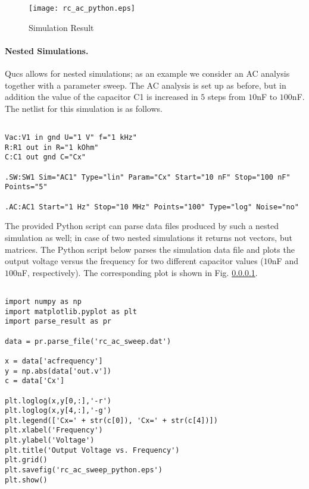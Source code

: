 \begin{figure}[h]
\begin{center}
  \texttt{[image: rc\_ac\_python.eps]}
  \caption{Simulation Result}
  \label{plot:rc_ac_python}
\end{center}
\end{figure}


\pagebreak

\paragraph{Nested Simulations.}Qucs allows for nested simulations; as an example we consider an AC analysis together with a parameter sweep. The AC analysis is set up as before, but in addition the value of the capacitor C1 is increased in $5$ steps from $10$nF to $100$nF. The netlist for this simulation is as follows.


\begin{verbatim}

Vac:V1 in gnd U="1 V" f="1 kHz"
R:R1 out in R="1 kOhm"
C:C1 out gnd C="Cx"

.SW:SW1 Sim="AC1" Type="lin" Param="Cx" Start="10 nF" Stop="100 nF" Points="5"

.AC:AC1 Start="1 Hz" Stop="10 MHz" Points="100" Type="log" Noise="no"

\end{verbatim}


The provided Python script can parse data files produced by such a nested simulation as well; in case of two nested simulations it returns not vectors, but matrices. The Python script below parses the simulation data file and plots the output voltage versus the frequency for two different capacitor values ($10$nF and $100$nF, respectively). The corresponding plot is shown in Fig. \ref{}.


\begin{verbatim}

import numpy as np
import matplotlib.pyplot as plt
import parse_result as pr

data = pr.parse_file('rc_ac_sweep.dat')

x = data['acfrequency']
y = np.abs(data['out.v'])
c = data['Cx']

plt.loglog(x,y[0,:],'-r')
plt.loglog(x,y[4,:],'-g')
plt.legend(['Cx=' + str(c[0]), 'Cx=' + str(c[4])])
plt.xlabel('Frequency')
plt.ylabel('Voltage')
plt.title('Output Voltage vs. Frequency')
plt.grid()
plt.savefig('rc_ac_sweep_python.eps')
plt.show()


\end{verbatim}


